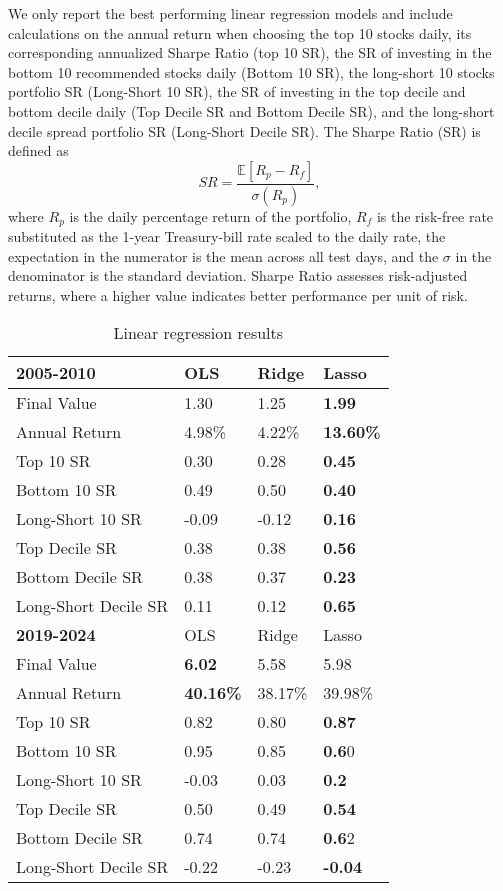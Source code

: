 \documentclass[preprint,12pt,numafflabel,authoryear]{elsarticle}
\begin{document}
We only report the best performing linear regression models and include calculations on the annual return when choosing the top 10 stocks daily, its corresponding annualized Sharpe Ratio (top 10 SR), the SR of investing in the bottom 10 recommended stocks daily (Bottom 10 SR), the long-short 10 stocks portfolio SR (Long-Short 10 SR), the SR of investing in the top decile and bottom decile daily (Top Decile SR and Bottom Decile SR), and the long-short decile spread portfolio SR (Long-Short Decile SR). The Sharpe Ratio (SR) is defined as
\begin{equation}
\label{eq:SR}
SR = \frac{\mathbb{E}[R_p - R_f]}{\sigma(R_p)},
\end{equation}
where $R_p$ is the daily percentage return of the portfolio, $R_f$ is the risk-free rate substituted as the 1-year Treasury-bill rate scaled to the daily rate, the expectation in the numerator is the mean across all test days, and the $\sigma$ in the denominator is the standard deviation. Sharpe Ratio assesses risk-adjusted returns, where a higher value indicates better performance per unit of risk.

\begin{table}[htp]
\centering
\begin{tabular}{ P{3cm} P{3cm} P{3cm} P{3cm}}
\toprule
\textbf{2005-2010} & OLS & Ridge & Lasso \\
\hline
Final Value & 1.30 & 1.25 & \textbf{1.99} \\
Annual Return & 4.98\% & 4.22\% & \textbf{13.60\%} \\
Top 10 SR & 0.30 & 0.28 & \textbf{0.45} \\
Bottom 10 SR & 0.49 & 0.50 & \textbf{0.40} \\
Long-Short 10 SR & -0.09 & -0.12 & \textbf{0.16} \\
\toprule
Top Decile SR & 0.38 & 0.38 & \textbf{0.56} \\
Bottom Decile SR & 0.38 & 0.37 & \textbf{0.23} \\
Long-Short Decile SR & 0.11 & 0.12 & \textbf{0.65}\\
\hhline{====}
\textbf{2019-2024} & OLS & Ridge & Lasso \\
\hline
Final Value & \textbf{6.02} & 5.58 & 5.98 \\
Annual Return & \textbf{40.16\%} & 38.17\% & 39.98\% \\
Top 10 SR & 0.82 & 0.80 & \textbf{0.87} \\
Bottom 10 SR & 0.95 & 0.85 & \textbf{0.6}0 \\
Long-Short 10 SR & -0.03 & 0.03 & \textbf{0.2} \\
\toprule
Top Decile SR & 0.50 & 0.49 & \textbf{0.54} \\
Bottom Decile SR & 0.74 & 0.74 & \textbf{0.6}2 \\
Long-Short Decile SR & -0.22 & -0.23 & \textbf{-0.04} \\
\bottomrule
\end{tabular}
\caption{Linear regression results}
\label{tab:linear regression}
\end{table}
\end{document}
